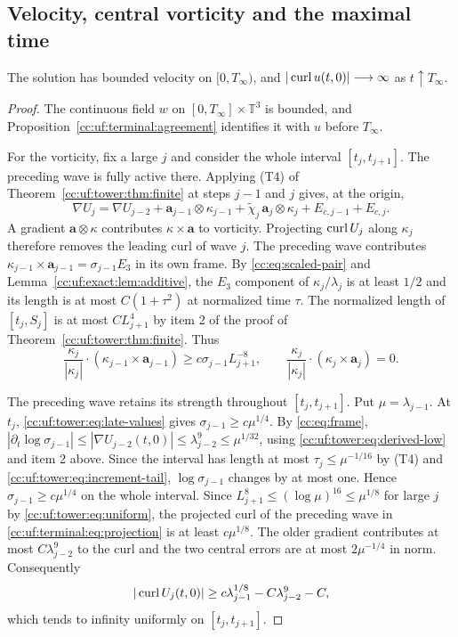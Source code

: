 \subsection{Velocity, central vorticity and the maximal time}

\begin{proposition}\label{cc:uf:terminal:velocity-curl}
The solution has bounded velocity on $[0,T_\infty)$, and
$|\operatorname{curl} u(t,0)|\longrightarrow\infty$ as $t\uparrow T_\infty$.
\end{proposition}
\begin{proof}
The continuous field $w$ on $[0,T_\infty]\times\mathbb T^3$ is bounded,
and Proposition~\ref{cc:uf:terminal:agreement} identifies it with $u$
before $T_\infty$.

For the vorticity, fix a large $j$ and consider the whole interval
$[t_j,t_{j+1}]$. The preceding wave is fully active there. Applying
\textup{(T4)} of Theorem~\ref{cc:uf:tower:thm:finite} at steps $j-1$
and $j$ gives, at the origin,
\[
 \nabla U_j=\nabla U_{j-2}
   +\mathbf a_{j-1}\otimes\kappa_{j-1}
   +\widetilde\chi_j\,\mathbf a_j\otimes\kappa_j+E_{c,j-1}+E_{c,j}.
\]
A gradient $\mathbf a\otimes\kappa$ contributes $\kappa\times\mathbf a$
to vorticity. Projecting $\operatorname{curl} U_j$ along $\kappa_j$ therefore removes
the leading curl of wave $j$. The preceding wave contributes
$\kappa_{j-1}\times\mathbf a_{j-1}=\sigma_{j-1}E_3$ in its own frame.
By \eqref{cc:eq:scaled-pair} and Lemma~\ref{cc:uf:exact:lem:additive},
the $E_3$ component of $\kappa_j/\lambda_j$ is at least $1/2$ and its
length is at most $C(1+\tau^2)$ at normalized time $\tau$.
The normalized length of $[t_j,S_j]$ is at most $CL_{j+1}^4$ by item 2
of the proof of Theorem~\ref{cc:uf:tower:thm:finite}. Thus
\begin{equation}\label{cc:uf:terminal:eq:projection}
 \frac{\kappa_j}{|\kappa_j|}\cdot(\kappa_{j-1}\times\mathbf a_{j-1})
    \ge c\sigma_{j-1}L_{j+1}^{-8},\qquad
 \frac{\kappa_j}{|\kappa_j|}\cdot(\kappa_j\times\mathbf a_j)=0.
\end{equation}

The preceding wave retains its strength throughout $[t_j,t_{j+1}]$.
Put $\mu=\lambda_{j-1}$. At $t_j$, \eqref{cc:uf:tower:eq:late-values}
gives $\sigma_{j-1}\ge c\mu^{1/4}$. By \eqref{cc:eq:frame},
$|\partial_t\log\sigma_{j-1}|\le|\nabla U_{j-2}(t,0)|
\le\lambda_{j-2}^9\le\mu^{1/32}$, using
\eqref{cc:uf:tower:eq:derived-low} and item 2 above. Since the interval
has length at most $\tau_j\le\mu^{-1/16}$ by \textup{(T4)} and
\eqref{cc:uf:tower:eq:increment-tail}, $\log\sigma_{j-1}$ changes by
at most one. Hence $\sigma_{j-1}\ge c\mu^{1/4}$ on the whole interval.
Since $L_{j+1}^8\le(\log\mu)^{16}\le\mu^{1/8}$ for large $j$ by
\eqref{cc:uf:tower:eq:uniform}, the projected curl of the preceding wave
in \eqref{cc:uf:terminal:eq:projection} is at least $c\mu^{1/8}$.
The older gradient contributes at most $C\lambda_{j-2}^9$ to the curl
and the two central errors are at most $2\mu^{-1/4}$ in norm. Consequently
\begin{equation}\label{cc:uf:terminal:eq:curl-lower}
 |\operatorname{curl} U_j(t,0)|
 \ge c\lambda_{j-1}^{1/8}-C\lambda_{j-2}^9-C,
\end{equation}
which tends to infinity uniformly on $[t_j,t_{j+1}]$.


\end{proof}

